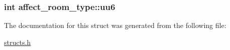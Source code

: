 \hypertarget{structaffect__room__type_acefa436b006c8fdc887e4e5961b06f12}{
\subsubsection[{uu6}]{\setlength{\rightskip}{0pt plus 5cm}int affect\-\_\-room\-\_\-type\-::uu6}}\label{structaffect__room__type_acefa436b006c8fdc887e4e5961b06f12}


The documentation for this struct was generated from the following file\-:\begin{DoxyCompactItemize}
\item 
\hyperlink{structs_8h}{structs.\-h}\end{DoxyCompactItemize}
